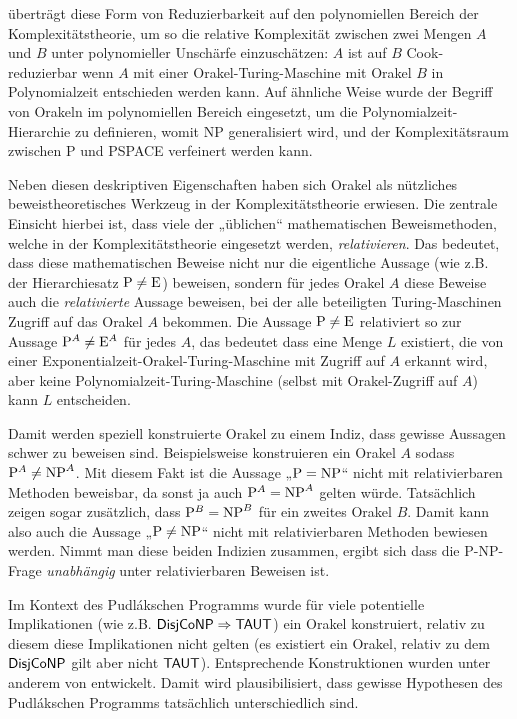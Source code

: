 \textcite{cook_complexity_1971} überträgt diese Form von Reduzierbarkeit auf den polynomiellen Bereich der Komplexitätstheorie, um so die relative Komplexität zwischen zwei Mengen $A$ und $B$ unter polynomieller Unschärfe einzuschätzen: $A$ ist auf $B$ Cook-reduzierbar wenn $A$ mit einer Orakel-Turing-Maschine mit Orakel $B$ in Polynomialzeit entschieden werden kann. Auf ähnliche Weise wurde der Begriff von Orakeln im polynomiellen Bereich eingesetzt, um die Polynomialzeit-Hierarchie zu definieren, womit NP generalisiert wird, und der Komplexitätsraum zwischen P und PSPACE verfeinert werden kann.

Neben diesen deskriptiven Eigenschaften haben sich Orakel als nützliches beweistheoretisches Werkzeug in der Komplexitätstheorie erwiesen. Die zentrale Einsicht hierbei ist, dass viele der „üblichen“ mathematischen Beweismethoden, welche in der Komplexitätstheorie eingesetzt werden, \emph{relativieren}. Das bedeutet, dass diese mathematischen Beweise nicht nur die eigentliche Aussage (wie z.B. der Hierarchiesatz $\P\neq \mathrm{E}$) beweisen, sondern für jedes Orakel $A$ diese Beweise auch die \emph{relativierte} Aussage beweisen, bei der  alle beteiligten Turing-Maschinen Zugriff auf das Orakel $A$ bekommen. Die Aussage $\P\neq \mathrm{E}$ relativiert so zur Aussage $\P^A\neq \mathrm{E}^A$ für jedes $A$, das bedeutet dass eine Menge $L$ existiert, die von einer Exponentialzeit-Orakel-Turing-Maschine mit Zugriff auf $A$ erkannt wird, aber keine Polynomialzeit-Turing-Maschine (selbst mit Orakel-Zugriff auf $A$) kann $L$ entscheiden.

Damit werden speziell konstruierte Orakel zu einem Indiz, dass gewisse Aussagen schwer zu beweisen sind.
Beispielsweise konstruieren \textcite{baker_relativizations_1975} ein Orakel $A$ sodass $\P^A\neq \NP^A$. Mit diesem Fakt ist die Aussage „$\P=\NP$“ nicht mit relativierbaren Methoden beweisbar, da sonst ja auch $\P^A=\NP^A$ gelten würde. Tatsächlich zeigen \citeauthor{baker_relativizations_1975} sogar zusätzlich, dass $\P^B= \NP^B$ für ein zweites Orakel $B$. Damit kann also auch die Aussage „$\P\neq\NP$“ nicht mit relativierbaren Methoden bewiesen werden. Nimmt man diese beiden Indizien zusammen, ergibt sich dass die P-NP-Frage \emph{unabhängig} unter relativierbaren Beweisen ist.

Im Kontext des Pudlákschen Programms wurde für viele potentielle Implikationen (wie z.B. $\hDisjCoNP\Rightarrow\hTAUT$) ein Orakel konstruiert, relativ zu diesem diese Implikationen nicht gelten (es existiert ein Orakel, relativ zu dem $\hDisjCoNP$ gilt aber nicht $\hTAUT$). Entsprechende Konstruktionen wurden unter anderem von \textcites{glaser_disjoint_2004}{dose_np-completeness_2019}{dose_balance_2020}{dose_further_2020}{dingel_separation_2022}{ehrmanntraut_oracle_2022}{khaniki_new_2022} entwickelt. Damit wird plausibilisiert, dass gewisse Hypothesen des Pudlákschen Programms tatsächlich unterschiedlich sind.

